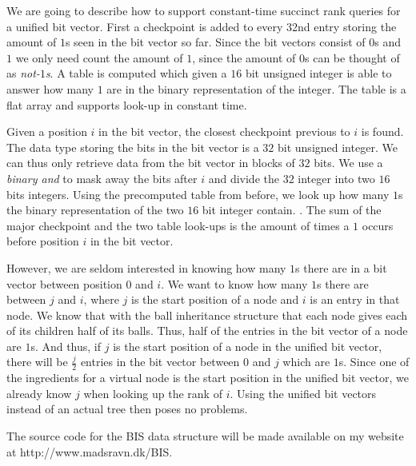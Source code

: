 We are going to describe how to support constant-time succinct rank queries for a unified bit vector. First a checkpoint is added to every 32nd entry storing the amount of $1$s seen in the bit vector so far. Since the bit vectors consist of $0$s and $1$ we only need count the amount of $1$, since the amount of $0$s can be thought of as \emph{not-$1$s}. A table is computed which given a $16$ bit unsigned integer is able to answer how many $1$ are in the binary representation of the integer. The table is a flat array and supports look-up in constant time.

Given a position $i$ in the bit vector, the closest checkpoint previous to $i$ is found. The data type storing the bits in the bit vector is a $32$ bit unsigned integer. We can thus only retrieve data from the bit vector in blocks of $32$ bits. We use a \emph{binary and} to mask away the bits after $i$ and divide the $32$ integer into two $16$ bits integers. Using the precomputed table from before, we look up how many $1$s the binary representation of the two $16$ bit integer contain. . The sum of the major checkpoint and the two table look-ups is the amount of times a $1$ occurs before position $i$ in the bit vector. 

However, we are seldom interested in knowing how many $1$s there are in a bit vector between position $0$ and $i$. We want to know how many $1$s there are between $j$ and $i$, where $j$ is the start position of a node and $i$ is an entry in that node. We know that with the ball inheritance structure that each node gives each of its children half of its balls. Thus, half of the entries in the bit vector of a node are $1$s. And thus, if $j$ is the start position of a node in the unified bit vector, there will be $\frac{j}{2}$ entries in the bit vector between $0$ and $j$ which are $1$s. Since one of the ingredients for a virtual node is the start position in the unified bit vector, we already know $j$ when looking up the rank of $i$. Using the unified bit vectors instead of an actual tree then poses no problems.

The source code for the BIS data structure will be made available on my website at http://www.madsravn.dk/BIS.



